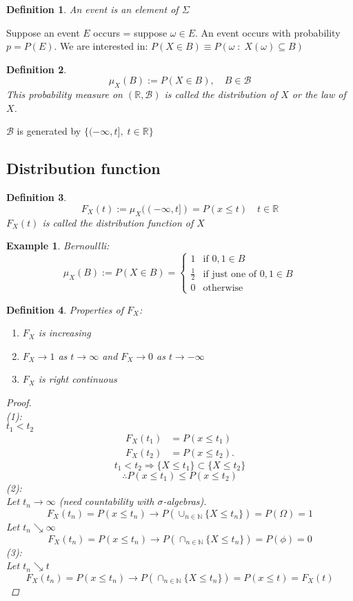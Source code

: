 \documentclass[12pt]{article}
\def\RR{\mathbb{R}}
\newtheorem{definition}{Definition}[section]
\newtheorem{example}{Example}[section]
\begin{document}
\begin{definition}
An event is an element of $\Sigma$
\end{definition}
Suppose an event $E$ occurs = suppose $\omega \in E$. An event occurs with probability $p= P(E)$. We are interested in: $P(X \in B) \equiv P(\omega \;:\;X(\omega) \subseteq B)$
\begin{definition}
\[\mu_X(B) := P(X\in B), \quad B \in \mathcal{B}\]
This probability measure on $(\RR , \mathcal{B})$ is called the distribution of $X$ or the law of $X$.\\
\end{definition}
$\mathcal{B}$ is generated by $\{(-\infty, t], \; t \in \RR\}$

\subsection{Distribution function}
\begin{definition}
\[F_X(t):= \mu_X((-\infty, t]) = P(x \leq t)\quad t\in \RR\]
$F_X(t)$ is called the distribution function of $X$
\end{definition}

\begin{example}
Bernoullli:
\[\mu_X(B) := P(X\in B) = \begin{cases}
   1 & \text{if }0,1\in B \\
   \frac{1}{2}      & \text{if just one of } 0 ,1 \in B\\
   0    & \text{otherwise}
  \end{cases}
\]
\end{example}

\begin{definition}\label{propFX}
Properties of $F_X$:
\begin{enumerate}
\item $F_X$ is increasing
\item $F_X \rightarrow 1$ as $t \rightarrow \infty$ and $F_X \rightarrow 0$ as $t \rightarrow -\infty$
\item $F_X$ is right continuous
\end{enumerate}
\begin{proof}\quad \\
(1):\quad\\
 $t_1<t_2$
\begin{align*}
F_X(t_1) &=P(x \leq t_1)\\
F_X(t_2) &=P(x \leq t_2).
\end{align*}
\[t_1<t_2 \Rightarrow \{X \leq t_1\} \subset \{X\leq t_2\}\]
\[ \therefore P(x \leq t_1)\leq P(x \leq t_2)\]
(2):\quad\\
 Let $t_n \rightarrow \infty$ (need countability with $\sigma$-algebras).
\[F_X (t_n) = P(x \leq t_n) \rightarrow P\left(\cup_{n \in \mathbb{N}}\{X\leq t_n\}\right) = P(\Omega) = 1\]
Let $t_n \searrow \infty$
\[F_X (t_n) = P(x \leq t_n) \rightarrow P\left(\cap_{n \in \mathbb{N}}\{X\leq t_n\}\right) = P(\phi) = 0\]
(3):\quad\\
Let $t_n \searrow t$
\[F_X (t_n) = P(x \leq t_n) \rightarrow P\left(\cap_{n \in \mathbb{N}}\{X\leq t_n\}\right) = P(x \leq t) = F_X(t)\]
\end{proof}
\end{definition}
\end{document}
